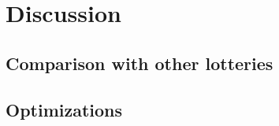 \chapter{Discussion}
\label{chap:discussion}

\section{Comparison with other lotteries}

\section{Optimizations}
